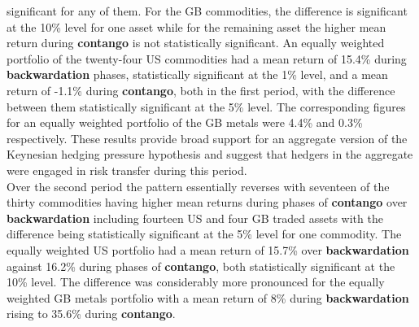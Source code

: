 \documentclass[
  authoryear,
  preprint,
  3p]{elsarticle}
\begin{document}
significant for any of them. For the GB commodities, the difference is
significant at the 10\% level for one asset while for the remaining
asset the higher mean return during \textbf{contango} is not
statistically significant. An equally weighted portfolio of the
twenty-four US commodities had a mean return of 15.4\% during
\textbf{backwardation} phases, statistically significant at the 1\%
level, and a mean return of -1.1\% during \textbf{contango}, both in the
first period, with the difference between them statistically significant
at the 5\% level. The corresponding figures for an equally weighted
portfolio of the GB metals were 4.4\% and 0.3\% respectively. These
results provide broad support for an aggregate version of the Keynesian
hedging pressure hypothesis and suggest that hedgers in the aggregate
were engaged in risk transfer during this period.\\
Over the second period the pattern essentially reverses with seventeen
of the thirty commodities having higher mean returns during phases of
\textbf{contango} over \textbf{backwardation} including fourteen US and
four GB traded assets with the difference being statistically
significant at the 5\% level for one commodity. The equally weighted US
portfolio had a mean return of 15.7\% over \textbf{backwardation}
against 16.2\% during phases of \textbf{contango}, both statistically
significant at the 10\% level. The difference was considerably more
pronounced for the equally weighted GB metals portfolio with a mean
return of 8\% during \textbf{backwardation} rising to 35.6\% during
\textbf{contango}.

\medskip
\end{document}
